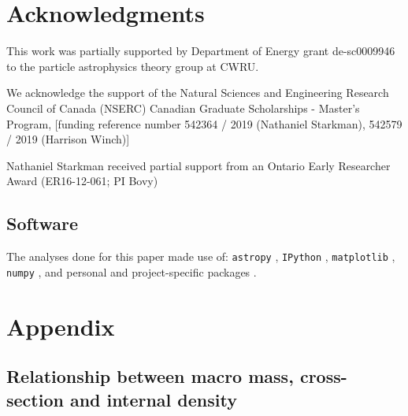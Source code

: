 \documentclass[%
 reprint,
 amsmath,amssymb,
 aps,
 nofootinbib, %
]{revtex4-2}
\begin{document}


\medskip
\section{Acknowledgments} %
\label{sec:acknowledgements}

    This work was partially supported by Department of Energy grant de-sc0009946 to the particle astrophysics theory group at CWRU.

    We acknowledge the support of the Natural Sciences and Engineering Research Council of Canada (NSERC) Canadian Graduate Scholarships - Master's Program, [funding reference number 542364 / 2019 (Nathaniel Starkman), 542579 / 2019 (Harrison Winch)]
    
    Nathaniel Starkman received partial support from an Ontario Early Researcher Award (ER16-12-061; PI Bovy)

    \subsection*{Software} %
    \label{sub:software_citation}

        The analyses done for this paper made use of: \texttt{astropy} \citet{code_Astropy2013, code_Astropy2018}, \texttt{IPython} \citet{code_Perez2007}, \texttt{matplotlib} \citet{code_Hunter2007}, \texttt{numpy} \citet{code_Walt2011}, and personal and project-specific packages \citet{code_utilipy2020, code_starkplot2020, code_macrolightning2020}.




\section{Appendix}  %
\label{sec:appendix}

    \subsection{Relationship between macro mass, cross-section and internal density}  %
    \label{app:cross_sections}
    
\end{document}

